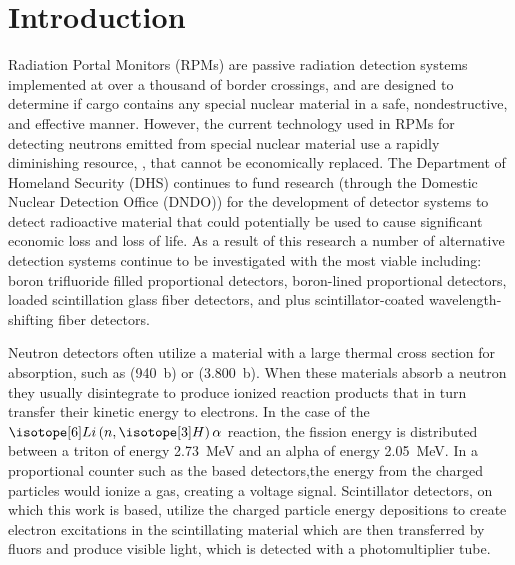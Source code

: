 \chapter{Introduction} 
\label{chap:Intro}
Radiation Portal Monitors (RPMs) are passive radiation detection systems implemented at over a thousand of border crossings, and are designed to determine if cargo contains any special nuclear material in a safe, nondestructive, and effective manner\cite{kouzes_neutron_2010}. 
However, the current technology used in RPMs for detecting neutrons emitted from special nuclear material use a rapidly diminishing resource, , that cannot be economically replaced. 
The Department of Homeland Security (DHS) continues to fund research (through the Domestic Nuclear Detection Office (DNDO)) for the development of detector systems to detect radioactive material that could potentially be used to cause significant economic loss and loss of life.  
As a result of this research a number of alternative detection systems continue to be investigated with the most viable including: boron trifluoride filled proportional detectors, boron-lined proportional detectors,  loaded scintillation glass fiber detectors, and  plus scintillator-coated wavelength-shifting fiber detectors\cite{pnnl_18471,kouzes_neutron_2010}.  

Neutron detectors often utilize a material with a large thermal cross section for absorption, such as  (\SI{940}{\barn}) or  (\SI{3,800}{\barn}).
When these materials absorb a neutron they usually disintegrate to produce ionized reaction products that in turn transfer their kinetic energy to electrons.
In the case of the $\iso[6]{Li}\left(n,\iso[3]{H}\right)\alpha$ reaction, the fission energy is distributed between a triton of energy \SI{2.73}{\mega\eV} and an alpha of energy \SI{2.05}{\mega\eV}.
In a proportional counter such as the  based detectors,the energy from the charged particles would ionize a gas, creating a voltage signal.
Scintillator detectors, on which this work is based, utilize the charged particle energy depositions to create electron excitations in the scintillating material which are then transferred by fluors and produce visible light, which is detected with a photomultiplier tube.

